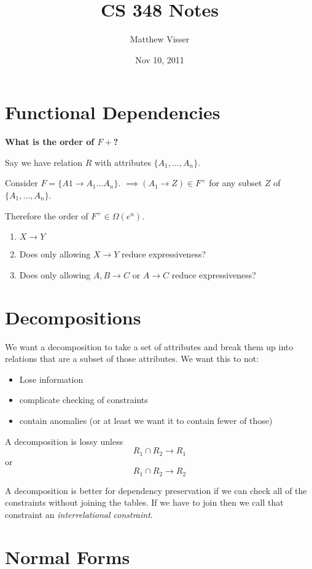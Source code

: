 \documentclass[12pt]{article}
\begin{document}
\title{CS 348 Notes}
\author{Matthew Visser}
\date{Nov 10, 2011}
\maketitle

\section{Functional Dependencies}

\textbf{What is the order of $F+$?}

Say we have relation $R$ with attributes $\{A_1,\dots,A_n\}$.

Consider $F = \{A1\to A_1\dots A_n\}$. $\implies (A_1 \to Z) \in F^{+}$ for any
subset $Z$ of $\{A_1,\dots,A_n\}$.

Therefore the order of $F^+ \in \Omega(e^n)$.

\begin{enumerate}
	\item $X \to Y$
	\item Does only allowing $X \to Y$ reduce expressiveness?
	\item Does only allowing $A,B\to C$ or $A \to C$ reduce expressiveness?
\end{enumerate}

\section{Decompositions}

We want a decomposition to take a set of attributes and break them up into
relations that are a subset of those attributes. We want this to not:
\begin{itemize}
	\item Lose information
	\item complicate checking of constraints
	\item contain anomalies (or at least we want it to contain fewer of those)
\end{itemize}

A decomposition is lossy unless
\[
R_1 \cap R_2 \to R_1\]
or
\[
R_1 \cap R_2 \to R_2\]

A decomposition is better for dependency preservation if we can check all of the
constraints without joining the tables. If we have to join then we call that
constraint an \emph{interrelational constraint}.

\section{Normal Forms}
\end{document}
